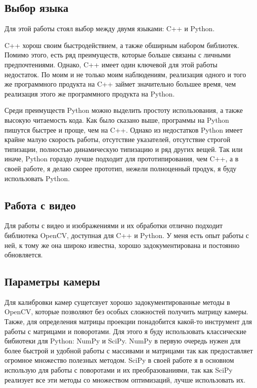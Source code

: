 \documentclass[12pt, a4paper]{article}
\begin{document}
\subsection{Выбор языка}
Для этой работы стоял выбор между двумя языками: C++ и Python. 
\par
C++ хорош своим быстродействием, а также обширным набором библиотек.
Помимо этого, есть ряд преимуществ, которые больше связаны с личными предпочтениями.
Однако, C++ имеет один ключевой для этой работы недостаток. По моим и не только
моим наблюдениям, реализация одного и того же программного продукта на C++
займет значительно большее время, чем реализация этого же программного продукта
на Python.
\par
Среди преимуществ Python можно выделить простоту использования, а также высокую читаемость кода. Как было сказано выше, программы на Python пишутся быстрее и проще, чем на C++. Однако из недостатков Python имеет крайне малую скорость работы, отсутствие указателей, отсутствие строгой типизации, полностью динамическую типизацию и ряд других вещей. Так или иначе, Python гораздо лучше подходит для прототипирования, чем C++, а в своей работе, я делаю скорее прототип, нежели полноценный продук, я буду использовать Python.

\subsection{Работа с видео}
Для работы с видео и изображениями и их обработки отлично подходит библиотека
OpenCV, доступная для C++ и Python. У меня есть опыт работы с ней, к тому же она
широко известна, хорошо задокументирована и постоянно обновляется.

\subsection{Параметры камеры}
Для калибровки камер сущетсвует хорошо
задокументированные\cite{opencv_calibration_tutorial, opencv_charuco_pose}
методы в OpenCV, которые позволяют без особых сложностей получить матрицу
камеры. Также, для определения матрицы проекции понадобится какой-то инструмент
для работы с матрицами и поворотами. Для этого я буду использовать классические
бибиотеки для Python: NumPy и SciPy. NumPy в первую очередь нужен для более
быстрой и удобной работы с массивами и матрицами так как предоставляет огромное
множество полезных методом. SciPy в своей работе я в основном использую для
работы с поворотами и их преобразованиями, так как SciPy реализует все эти
методы со множеством оптимизаций, лучше использовать их.
\end{document}
